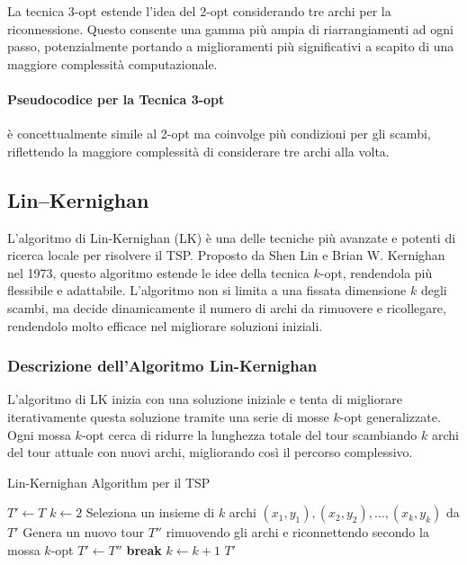 La tecnica 3-opt estende l'idea del 2-opt considerando tre archi per la riconnessione. Questo consente una gamma più ampia di riarrangiamenti ad ogni passo, potenzialmente portando a miglioramenti più significativi a scapito di una maggiore complessità computazionale.

\paragraph{Pseudocodice per la Tecnica 3-opt} è concettualmente simile al 2-opt ma coinvolge più condizioni per gli scambi, riflettendo la maggiore complessità di considerare tre archi alla volta.

\subsection{Lin–Kernighan}

L'algoritmo di Lin-Kernighan (\gls{LK}) è una delle tecniche più avanzate e potenti di ricerca locale per risolvere il \gls{TSP}. Proposto da Shen Lin e Brian W. Kernighan nel 1973, questo algoritmo estende le idee della tecnica \(k\)-opt, rendendola più flessibile e adattabile. L'algoritmo non si limita a una fissata dimensione \(k\) degli scambi, ma decide dinamicamente il numero di archi da rimuovere e ricollegare, rendendolo molto efficace nel migliorare soluzioni iniziali.

\subsubsection{Descrizione dell'Algoritmo Lin-Kernighan}

L'algoritmo di \gls{LK} inizia con una soluzione iniziale e tenta di migliorare iterativamente questa soluzione tramite una serie di mosse \(k\)-opt generalizzate. Ogni mossa \(k\)-opt cerca di ridurre la lunghezza totale del tour scambiando \(k\) archi del tour attuale con nuovi archi, migliorando così il percorso complessivo.

\begin{algorithm}
	\caption{Lin-Kernighan Algorithm per il \gls{TSP}}\label{alg:lin-kernighan}
	\begin{algorithmic}[1]
		 
		\State $T' \gets T$ 
		\Repeat
		\State $k \gets 2$
		\Repeat
		\State Seleziona un insieme di $k$ archi $(x_1, y_1), (x_2, y_2), \ldots, (x_k, y_k)$ da $T'$
		\State Genera un nuovo tour $T''$ rimuovendo gli archi e riconnettendo secondo la mossa $k$-opt
		\State $T' \gets T''$
		\State \textbf{break} 
		\EndIf
		\State $k \gets k + 1$
		\EndFor
		\State \Return $T'$
		\EndProcedure
	\end{algorithmic}
\end{algorithm}


